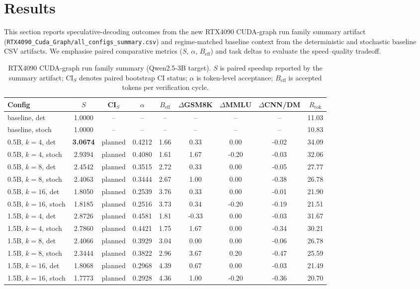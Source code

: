\section{Results}
\label{sec:results}

This section reports speculative-decoding outcomes from the new
RTX4090 CUDA-graph run family summary artifact
(\texttt{RTX4090\_Cuda\_Graph/all\_configs\_summary.csv}) and
regime-matched baseline context from the deterministic and stochastic baseline
CSV artifacts. We emphasise paired comparative metrics
($S$, $\alpha$, $B_{\text{eff}}$) and task deltas to evaluate the
speed--quality tradeoff.

\begin{table}[t]
\centering
\caption{RTX4090 CUDA-graph run family summary (Qwen2.5-3B target).
$S$ is paired speedup reported by the summary artifact; CI$_S$ denotes paired
bootstrap CI status; $\alpha$ is token-level acceptance; $B_{\text{eff}}$ is
accepted tokens per verification cycle.}
\label{tab:headline}
\small
\begin{tabular}{l c c c c c c c c}
\hline
\textbf{Config} & $S$ & CI$_S$ & $\alpha$ & $B_{\text{eff}}$ & $\Delta$GSM8K & $\Delta$MMLU & $\Delta$CNN/DM & $R_{\text{tok}}$ \\
\hline
baseline, det        & 1.0000 & -- & -- & -- & -- & -- & -- & 11.03 \\
baseline, stoch      & 1.0000 & -- & -- & -- & -- & -- & -- & 10.83 \\
0.5B, $k{=}4$, det   & \textbf{3.0674} & planned & 0.4212 & 1.66 & 0.33 & 0.00 & -0.02 & 34.09 \\
0.5B, $k{=}4$, stoch & 2.9394 & planned & 0.4080 & 1.61 & 1.67 & -0.20 & -0.03 & 32.06 \\
0.5B, $k{=}8$, det   & 2.4542 & planned & 0.3515 & 2.72 & 0.33 & 0.00 & -0.05 & 27.77 \\
0.5B, $k{=}8$, stoch & 2.4063 & planned & 0.3444 & 2.67 & 1.00 & 0.00 & -0.38 & 26.78 \\
0.5B, $k{=}16$, det  & 1.8050 & planned & 0.2539 & 3.76 & 0.33 & 0.00 & -0.01 & 21.90 \\
0.5B, $k{=}16$, stoch& 1.8185 & planned & 0.2516 & 3.73 & 0.34 & -0.20 & -0.19 & 21.51 \\
1.5B, $k{=}4$, det   & 2.8726 & planned & 0.4581 & 1.81 & -0.33 & 0.00 & -0.03 & 31.67 \\
1.5B, $k{=}4$, stoch & 2.7860 & planned & 0.4421 & 1.75 & 1.67 & 0.00 & -0.34 & 30.21 \\
1.5B, $k{=}8$, det   & 2.4066 & planned & 0.3929 & 3.04 & 0.00 & 0.00 & -0.06 & 26.78 \\
1.5B, $k{=}8$, stoch & 2.3444 & planned & 0.3822 & 2.96 & 3.67 & 0.20 & -0.47 & 25.59 \\
1.5B, $k{=}16$, det  & 1.8068 & planned & 0.2968 & 4.39 & 0.67 & 0.00 & -0.03 & 21.49 \\
1.5B, $k{=}16$, stoch& 1.7773 & planned & 0.2928 & 4.36 & 1.00 & -0.20 & -0.36 & 20.70 \\
\hline
\end{tabular}
\end{table}

